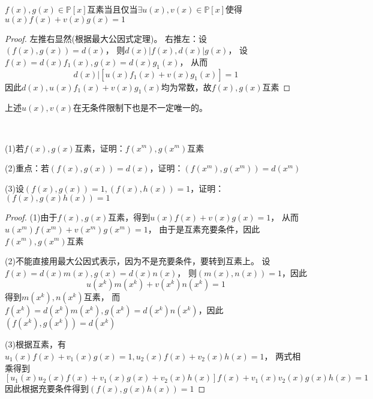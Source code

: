 \begin{theorem}[互素充要条件]
  $f(x),g(x) \in \mathbb{P}[x]$互素当且仅当$\exists u(x),v(x) \in \mathbb{P}[x]$使得$u(x)f(x) + v(x)g(x) = 1$
\end{theorem}

\begin{proof}
  左推右显然(根据最大公因式定理)。
  右推左：设$(f(x),g(x)) = d(x)$，
  则$d(x)|f(x), d(x)|g(x)$，
  设$f(x) = d(x)f_1(x), g(x) = d(x)g_1(x)$，
  从而
  \begin{equation*}
    d(x) |[u(x)f_1(x) + v(x)g_1(x)] = 1
  \end{equation*}
  因此$d(x), u(x)f_1(x) + v(x)g_1(x)$均为常数，故$f(x),g(x)$互素
\end{proof}

\begin{note}
  上述$u(x),v(x)$在无条件限制下也是不一定唯一的。
\end{note}

~

\begin{exercise}[互素相关应用]
  (1)若$f(x),g(x)$互素，证明：$f(x^m),g(x^m)$互素

  (2)重点：若$(f(x),g(x)) = d(x)$，证明：$(f(x^m),g(x^m)) = d(x^m)$

  (3)设$(f(x),g(x)) = 1, (f(x),h(x)) = 1$，证明：$(f(x),g(x)h(x)) = 1$
\end{exercise}

\begin{proof}
  (1)由于$f(x),g(x)$互素，得到$u(x)f(x)+v(x)g(x) = 1$，
  从而$u(x^m)f(x^m) + v(x^m)g(x^m) = 1$，
  由于是互素充要条件，因此$f(x^m), g(x^m)$互素

  (2)不能直接用最大公因式表示，因为不是充要条件，要转到互素上。
  设$f(x) = d(x)m(x), g(x) = d(x)n(x)$，
  则$(m(x),n(x)) = 1$，因此
  \begin{equation*}
    u(x^k)m(x^k) + v(x^k)n(x^k) = 1
  \end{equation*}
  得到$m(x^k), n(x^k)$互素，
  而$f(x^k) = d(x^k)m(x^k), g(x^k) = d(x^k)n(x^k)$，因此$(f(x^k),g(x^k)) = d(x^k)$

  (3)根据互素，有$u_1(x)f(x)+v_1(x)g(x) = 1, u_2(x)f(x) + v_2(x)h(x) = 1$，
  两式相乘得到
  \begin{equation*}
    \left[ u_1(x)u_2(x)f(x) + v_1(x)g(x) + v_2(x)h(x) \right]f(x) + v_1(x)v_2(x)g(x)h(x) = 1
  \end{equation*}
  因此根据充要条件得到$(f(x),g(x)h(x)) = 1$
\end{proof}


~

